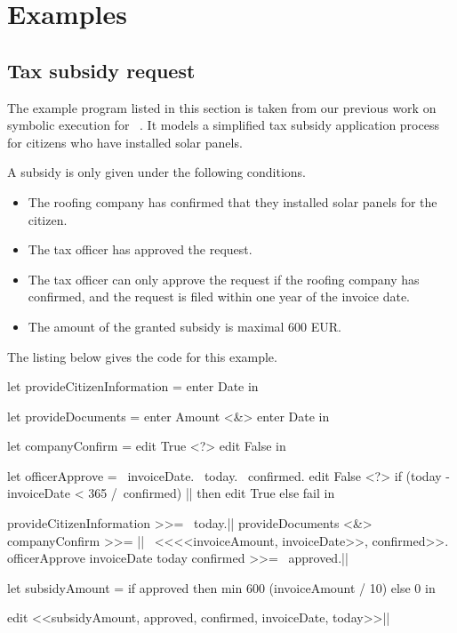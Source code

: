 
\section{Examples}
\label{sec:examples}

\subsection{Tax subsidy request}

The example program listed in this section is taken from our previous work on symbolic execution for \TOPHAT~\cite{Steenvoorden2019}.
It models a simplified tax subsidy application process for citizens who have installed solar panels.

A subsidy is only given under the following conditions.
\begin{itemize}
\item The roofing company has confirmed that they installed solar panels for the citizen.
\item The tax officer has approved the request.
\item The tax officer can only approve the request if the roofing company has confirmed, and the request is filed within one year of the invoice date.
\item The amount of the granted subsidy is maximal 600 EUR.
\end{itemize}

The listing below gives the \TOPHAT code for this example.

\begin{TASK}[float=ht
            ,numbers=right
            ,caption=Subsidy request and approval workflow at the Dutch tax office.
            ,label=lst:tax
            ]
  let provideCitizenInformation = enter Date in

    let provideDocuments = enter Amount <&> enter Date in

      let companyConfirm = edit True <?> edit False in

        let officerApprove = \ invoiceDate. \ today. \ confirmed.
          edit False <?> if (today - invoiceDate < 365 /\ confirmed) |\label{lst:tax:officer-approve-def}| then edit True else fail in

            provideCitizenInformation >>= \ today.|\label{lst:tax:citizen-info}|
            provideDocuments <&> companyConfirm >>= |\label{lst:tax:documents-and-company-confirm}|
              \ <<<<invoiceAmount, invoiceDate>>, confirmed>>.
              officerApprove invoiceDate today confirmed >>= \ approved.|\label{lst:tax:officer-approve}|

          let subsidyAmount = if approved then min 600 (invoiceAmount / 10) else 0 in

            edit <<subsidyAmount, approved, confirmed, invoiceDate, today>>|\label{lst:tax:result}|
\end{TASK}


